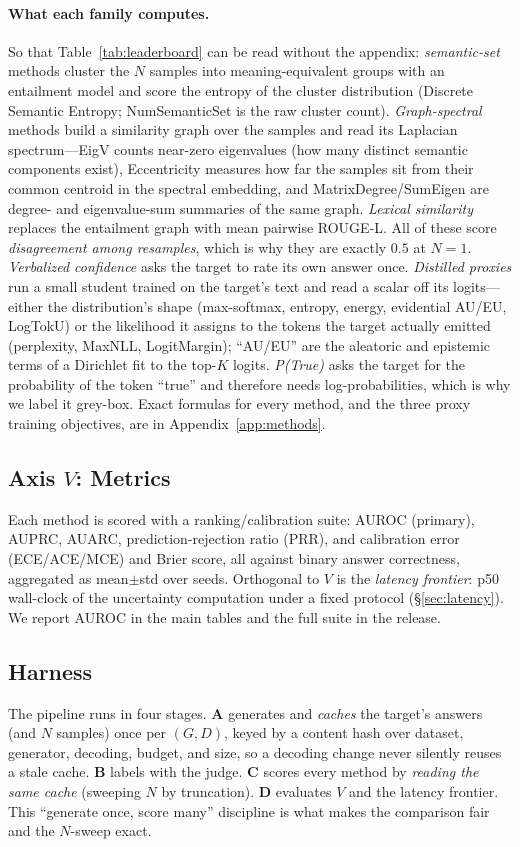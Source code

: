 \documentclass[11pt]{article}
\begin{document}
\paragraph{What each family computes.} So that Table~\ref{tab:leaderboard} can be read without
the appendix: \emph{semantic-set} methods cluster the $N$ samples into meaning-equivalent groups
with an entailment model and score the entropy of the cluster distribution (Discrete Semantic
Entropy; NumSemanticSet is the raw cluster count). \emph{Graph-spectral} methods build a
similarity graph over the samples and read its Laplacian spectrum---EigV counts near-zero
eigenvalues (how many distinct semantic components exist), Eccentricity measures how far the
samples sit from their common centroid in the spectral embedding, and MatrixDegree/SumEigen are
degree- and eigenvalue-sum summaries of the same graph. \emph{Lexical similarity} replaces the
entailment graph with mean pairwise ROUGE-L. All of these score \emph{disagreement among
resamples}, which is why they are exactly $0.5$ at $N{=}1$. \emph{Verbalized confidence} asks the
target to rate its own answer once. \emph{Distilled proxies} run a small student trained on the
target's text and read a scalar off its logits---either the distribution's shape (max-softmax,
entropy, energy, evidential AU/EU, LogTokU) or the likelihood it assigns to the tokens the target
actually emitted (perplexity, MaxNLL, LogitMargin); ``AU/EU'' are the aleatoric and epistemic
terms of a Dirichlet fit to the top-$K$ logits. \emph{P(True)} asks the target for the probability
of the token ``true'' and therefore needs log-probabilities, which is why we label it grey-box.
Exact formulas for every method, and the three proxy training objectives, are in
Appendix~\ref{app:methods}.

\subsection{Axis $V$: Metrics}
Each method is scored with a ranking/calibration suite: AUROC (primary), AUPRC, AUARC,
prediction-rejection ratio (PRR), and calibration error (ECE/ACE/MCE) and Brier score,
all against binary answer correctness, aggregated as mean$\pm$std over seeds. Orthogonal
to $V$ is the \emph{latency frontier}: p50 wall-clock of the uncertainty computation
under a fixed protocol (\S\ref{sec:latency}). We report AUROC in the main tables and the
full suite in the release.

\subsection{Harness}
The pipeline runs in four stages. \textbf{A} generates and \emph{caches} the target's
answers (and $N$ samples) once per $(G,D)$, keyed by a content hash over dataset,
generator, decoding, budget, and size, so a decoding change never silently reuses a stale
cache. \textbf{B} labels with the judge. \textbf{C} scores every method by \emph{reading
the same cache} (sweeping $N$ by truncation). \textbf{D} evaluates $V$ and the latency
frontier. This ``generate once, score many'' discipline is what makes the comparison
fair and the $N$-sweep exact.
\end{document}
